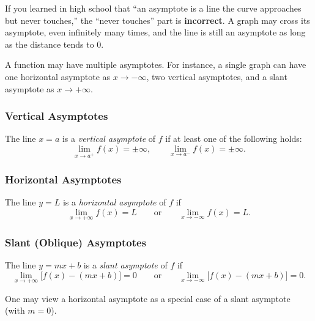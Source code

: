 \begin{remark}[Warning]
If you learned in high school that ``an asymptote is a line the curve approaches but never touches,'' the ``never touches'' part is \textbf{incorrect}.  A graph may cross its asymptote, even infinitely many times, and the line is still an asymptote as long as the distance tends to $0$.
\end{remark}

A function may have multiple asymptotes.  For instance, a single graph can have one horizontal asymptote as $x \to -\infty$, two vertical asymptotes, and a slant asymptote as $x \to +\infty$.

\subsubsection*{Vertical Asymptotes}

\begin{definition}
\label{def:6-5}
The line $x = a$ is a \emph{vertical asymptote} of $f$ if at least one of the following holds:
\[
  \lim_{x \to a^{+}}f(x) = \pm\infty, \qquad \lim_{x \to a^{-}}f(x) = \pm\infty.
\]
\end{definition}

\subsubsection*{Horizontal Asymptotes}

\begin{definition}
\label{def:6-6}
The line $y = L$ is a \emph{horizontal asymptote} of $f$ if
\[
  \lim_{x \to +\infty}f(x) = L \qquad\text{or}\qquad \lim_{x \to -\infty}f(x) = L.
\]
\end{definition}

\subsubsection*{Slant (Oblique) Asymptotes}

\begin{definition}
\label{def:6-7}
The line $y = mx + b$ is a \emph{slant asymptote} of $f$ if
\[
  \lim_{x \to +\infty}\bigl[f(x) - (mx + b)\bigr] = 0 \qquad\text{or}\qquad \lim_{x \to -\infty}\bigl[f(x) - (mx + b)\bigr] = 0.
\]
\end{definition}

\begin{remark}
One may view a horizontal asymptote as a special case of a slant asymptote (with $m = 0$).
\end{remark}

